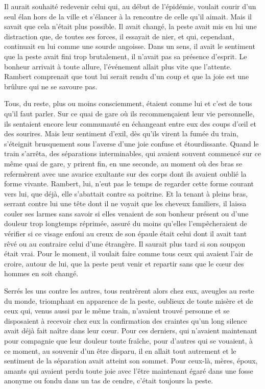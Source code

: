 \documentclass[french,twoside]{book} %
\begin{document}
Il aurait souhaité redevenir celui qui, au début de l’épidémie, voulait courir d’un seul élan hors de la ville et s’élancer à la rencontre de celle qu’il aimait. Mais il savait que cela n’était plus possible. Il avait changé, la peste avait mis en lui une distraction que, de toutes ses forces, il essayait de nier, et qui, cependant, continuait en lui comme une sourde angoisse. Dans un sens, il avait le sentiment que la peste avait fini trop brutalement, il n’avait pas sa présence d’esprit. Le bonheur arrivait à toute allure, l’événement allait plus vite que l’attente. Rambert comprenait que tout lui serait rendu d’un coup et que la joie est une brûlure qui ne se savoure pas.\par
Tous, du reste, plus ou moins consciemment, étaient comme lui et c’est de tous qu’il faut parler. Sur ce quai de gare où ils recommençaient leur vie personnelle, ils sentaient encore leur communauté en échangeant entre eux des coups d’œil et des sourires. Mais leur sentiment d’exil, dès qu’ils virent la fumée du train, s’éteignit brusquement sous l’averse d’une joie confuse et étourdissante. Quand le train s’arrêta, des séparations interminables, qui avaient souvent commencé sur ce même quai de gare, y prirent fin, en une seconde, au moment où des bras se refermèrent avec une avarice exultante sur des corps dont ils avaient oublié la forme vivante. Rambert, lui, n’eut pas le temps de regarder cette forme courant vers lui, que déjà, elle s’abattait contre sa poitrine. Et la tenant à pleins bras, serrant contre lui une tête dont il ne voyait que les cheveux familiers, il laissa couler ses larmes sans savoir si elles venaient de son bonheur présent ou d’une douleur trop longtemps réprimée, assuré du moins qu’elles l’empêcheraient de vérifier si ce visage enfoui au creux de son épaule était celui dont il avait tant rêvé ou au contraire celui d’une étrangère. Il saurait plus tard si son soupçon était vrai. Pour le moment, il voulait faire comme tous ceux qui avaient l’air de croire, autour de lui, que la peste peut venir et repartir sans que le cœur des hommes en soit changé.\par
Serrés les uns contre les autres, tous rentrèrent alors chez eux, aveugles au reste du monde, triomphant en apparence de la peste, oublieux de toute misère et de ceux qui, venus aussi par le même train, n’avaient trouvé personne et se disposaient à recevoir chez eux la confirmation des craintes qu’un long silence avait déjà fait naître dans leur cœur. Pour ces derniers, qui n’avaient maintenant pour compagnie que leur douleur toute fraîche, pour d’autres qui se vouaient, à ce moment, au souvenir d’un être disparu, il en allait tout autrement et le sentiment de la séparation avait atteint son sommet. Pour ceux-là, mères, époux, amants qui avaient perdu toute joie avec l’être maintenant égaré dans une fosse anonyme ou fondu dans un tas de cendre, c’était toujours la peste.\par
\end{document}
